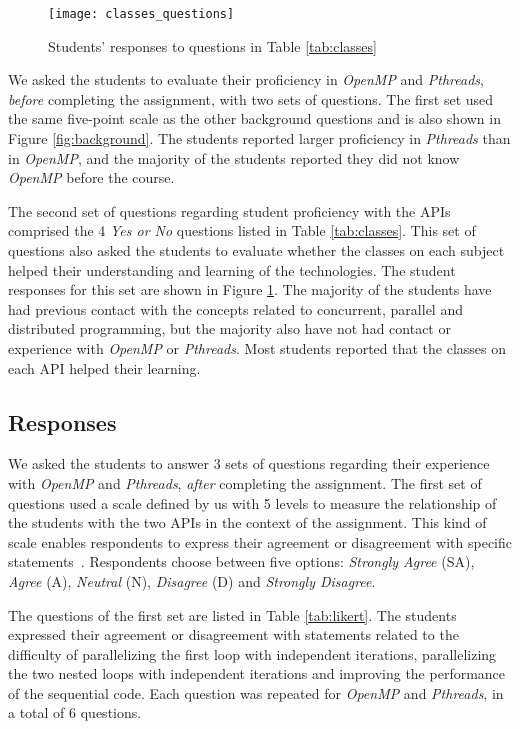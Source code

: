 \begin{figure}[htpb]
    \vspace{-0.7em}
    \centering
    \texttt{[image: classes\_questions]}
    \caption{Students' responses to questions in Table \ref{tab:classes}}
    \label{fig:classes}
    \vspace{-1em}
\end{figure}

We asked the students to evaluate their proficiency in \textit{OpenMP} and
\textit{Pthreads}, \textit{before} completing the assignment, with two sets of
questions. The first set used the same five-point scale as the other background
questions and is also shown in Figure \ref{fig:background}. The students
reported larger proficiency in \textit{Pthreads} than in
\textit{OpenMP}, and the majority of the students reported they did not know
\textit{OpenMP} before the course.

The second set of questions regarding student proficiency with the APIs
comprised the 4 \textit{Yes or No} questions listed in Table \ref{tab:classes}.
This set of questions also asked the students to evaluate whether the classes
on each subject helped their understanding and learning of the technologies.
The student responses for this set are shown in Figure \ref{fig:classes}.  The
majority of the students have had previous contact with the concepts related to
concurrent, parallel and distributed programming, but the majority also have
not had contact or experience with \textit{OpenMP} or \textit{Pthreads}.  Most
students reported that the classes on each API helped their learning.

\subsection{Responses}

We asked the students to answer 3 sets of questions regarding their
experience with \textit{OpenMP} and \textit{Pthreads}, \textit{after}
completing the assignment.
The first set of questions used a scale defined by us with 5 levels to measure the relationship
of the students with the two APIs in the context of the assignment. This kind of scale enables respondents to express their agreement
or disagreement with specific statements~\cite{likert1932technique}. Respondents choose between five
options: \textit{Strongly Agree} (SA), \textit{Agree} (A), \textit{Neutral}
(N), \textit{Disagree} (D) and \textit{Strongly Disagree}.

The questions of the first set are listed in Table \ref{tab:likert}. The
students expressed their agreement or disagreement with statements related to
the difficulty of parallelizing the first loop with independent iterations,
parallelizing the two nested loops with independent iterations and improving
the performance of the sequential code. Each question was repeated for
\textit{OpenMP} and \textit{Pthreads}, in a total of $6$ questions.

